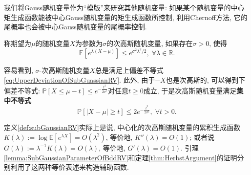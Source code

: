 我们将Gauss随机变量作为“模版”来研究其他随机变量: 如果某个随机变量的中心矩生成函数能被中心Gauss随机变量的矩生成函数所控制, 利用Chernoff方法, 它的尾概率也会被中心Gauss随机变量的尾概率控制. 

\begin{definition}[次高斯随机变量]\label{def:subGaussianRV}
	称期望为$\mu$的随机变量$X$为参数为$\sigma$的次高斯随机变量, 如果存在$\sigma > 0$, 使得
	\begin{equation*}
		\mathbb{E}[e^{\lambda(X - \mu)}] \leq e^{\sigma^2 \lambda^2 /2},\; \forall \lambda \in \mathbb{R}.   
	\end{equation*}  
\end{definition}
容易看到, $\sigma$-次高斯随机变量$X$总是满足上偏差不等式 \eqref{eq:UpperDeviationOfSubGuassianRV}.  
此外, 由于$-X$也是次高斯的, 可以得到下偏差不等式: $\mathbb{P}[X \leq \mu - t] \leq e^{- \frac{t^2}{2 \sigma^2}}$对任意$t \geq 0$成立, 于是次高斯随机变量满足\textbf{集中不等式}
\begin{equation}\label{eq:SubGuassianConcentration}
	\mathbb{P}[|X - \mu| \geq t] \leq 2 e^{- \frac{t^2}{2 \sigma^2}},\; \forall t > 0. 
\end{equation}

\begin{remark}[辅助函数的构造]
	定义\ref{def:subGaussianRV}实际上是说, 中心化的次高斯随机变量的累积生成函数$K(\lambda) := \log \mathbb{E}[e^{\lambda X}] = O(\lambda^2)$, 等价地, $K''(\lambda) = O(1)$; 
	或者说$G(\lambda) := \lambda^{-1} K(\lambda) = O(\lambda)$, 等价地, $G'(\lambda) = O(1)$. 
	引理\ref{lemma:SubGaussianParameterOfBddRV}和定理\ref{thm:HerbstArgument}的证明分别利用了这两种等价表述来构造辅助函数. 
\end{remark}

